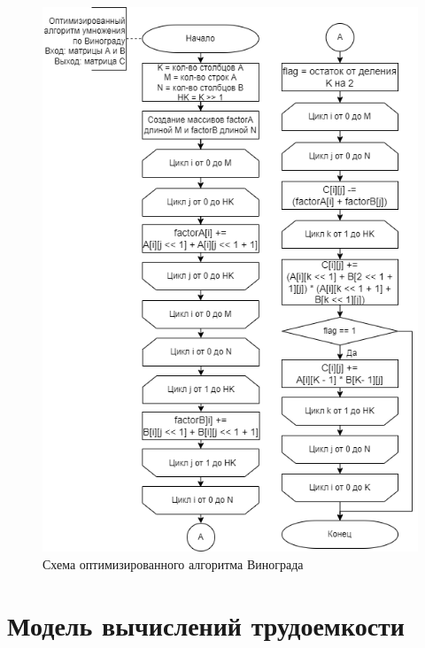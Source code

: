 \documentclass[a4paper,14pt, unknownkeysallowed]{extreport}
\begin{document}
\begin{figure}[h!]
	\centering
	\includegraphics[scale=0.9]{img/opt_wino.png}
	\caption{Схема оптимизированного алгоритма Винограда}
	\label{fig:wino}
\end{figure}

\clearpage
	
\section{Модель вычислений трудоемкости}
\end{document}

